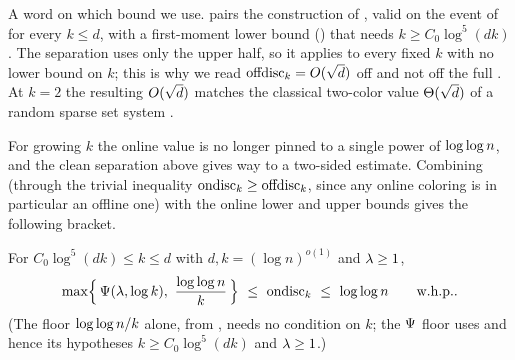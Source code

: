 A word on which bound we use.  pairs the construction of , valid on the event of
 for every $k\le d$, with a first-moment lower bound () that needs
$k\ge C_0\log^5(dk)$. The separation uses only the upper half, so it applies to every fixed $k$ with no lower bound on $k$;
this is why we read $\mathrm{offdisc}_k=O(\sqrt d)$ off  and not off the full . At $k=2$
the resulting $O(\sqrt d)$ matches the classical two-color value $\Theta(\sqrt d)$ of a random sparse set system
\cite{BansalMeka2019,EzraLovett2016,HobergRothvoss2019}.

For growing $k$ the online value is no longer pinned to a single power of $\log\log n$, and the clean separation above gives
way to a two-sided estimate. Combining  (through the trivial inequality $\mathrm{ondisc}_k\ge\mathrm{offdisc}_k$, since any
online coloring is in particular an offline one) with the online lower and upper bounds
 gives the following bracket.

\begin{corollary}\label{cor:bracket}
For $C_0\log^5(dk)\le k\le d$ with $d,k=(\log n)^{o(1)}$ and $\lambda\ge1$,
\[
  \max\!\Big\{\,\Psi(\lambda,\log k),\ \frac{\log\log n}{k}\,\Big\}\ \le\ \mathrm{ondisc}_k\ \le\ \log\log n\qquad\textnormal{w.h.p.}.
\]
(The floor $\log\log n/k$ alone, from , needs no condition on $k$; the $\Psi$ floor uses
 and hence its hypotheses $k\ge C_0\log^5(dk)$ and $\lambda\ge1$.)
\end{corollary}


